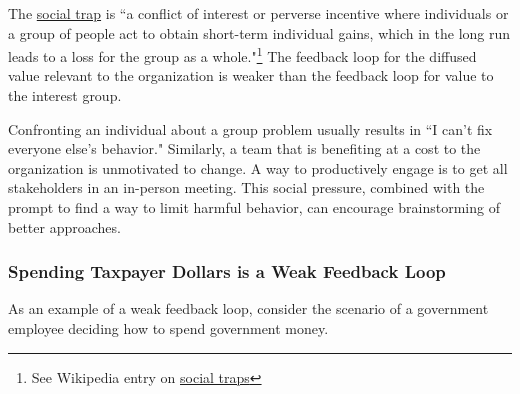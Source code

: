 The \href{https://en.wikipedia.org/wiki/Social_trap}{social trap}
\iftoggle{WPinmargin}{\marginpar{$>$Wikipedia: social trap}}{ }%
is ``a conflict of interest or perverse incentive where individuals or a group of people act to obtain short-term individual gains, which in the long run leads to a loss for the group as a whole."\footnote{See Wikipedia entry on \href{https://en.wikipedia.org/wiki/Social_trap}{social traps}}
The feedback loop for the diffused value relevant to the organization is weaker than the feedback loop for value to the interest group. 

Confronting an individual about a group problem usually results in ``I can't fix everyone else's behavior." Similarly, a team that is benefiting at a cost to the organization is unmotivated to change. A way to productively engage is to get all stakeholders in an in-person meeting. 
%
%
This social pressure, combined with the prompt to find a way to limit harmful behavior, can encourage brainstorming of better approaches. 

\subsubsection*{Spending Taxpayer Dollars is a Weak Feedback Loop}

As an example of a weak feedback loop, consider the scenario of a government employee deciding how to spend government money.

